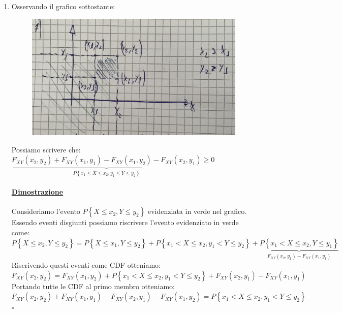 \documentclass{article}
\begin{document}
\begin{enumerate}
\begin{figure}[H]
    \end{figure} 
    \item Osservando il grafico sottostante:
    \begin{figure}[H]
    \centering
    \includegraphics[scale=0.12]{images/73.Prop7CDFVettA.jpeg}
    \end{figure} 
    Possiamo scrivere che: \\
    $\underset{P\left\{x_1 \leq X \leq x_2, y_1 \leq Y \leq y_2\right\}}{\underbrace{F_{XY}(x_2,y_2) + F_{XY}(x_1,y_1) - F_{XY}(x_1,y_2) - F_{XY}(x_2,y_1)}} \geq 0$
    \paragraph{\underline{Dimostrazione}}
    Consideriamo l’evento $P \left\{X \leq x_2, Y \leq y_2 \right\}$ evidenziata in verde nel grafico. \\
    Essendo eventi disgiunti possiamo riscrivere l’evento evidenziato in verde come: \\
    $P\left\{X \leq x_2 , Y \leq y_2 \right\} = P\left\{X \leq x_1 , Y \leq y_2 \right\} + P\left\{x_1 < X \leq x_2, y_1 < Y \leq y_2 \right\} + \underset{F_{XY}(x_2,y_1) - F_{XY}(x_1,y_1)}{\underbrace{P\left\{x_1 < X \leq x_2, Y \leq y_1\right\}}}$ \\
    Riscrivendo questi eventi come CDF otteniamo: \\
    $F_{XY}(x_2,y_2) = F_{XY}(x_1,y_2) + P\left\{x_1 < X \leq x_2, y_1 < Y \leq y_2 \right\} + F_{XY}(x_2,y_1) - F_{XY}(x_1,y_1)$ \\
    Portando tutte le CDF al primo membro otteniamo: \\
    $F_{XY}(x_2,y_2) + F_{XY}(x_1,y_1) - F_{XY}(x_2,y_1) - F_{XY}(x_1,y_2) = P\left\{x_1 < X \leq x_2, y_1 < Y \leq y_2 \right\} $ \\
    \hspace*{0pt}\hfill $\square$ 
\end{enumerate}
\end{document}
